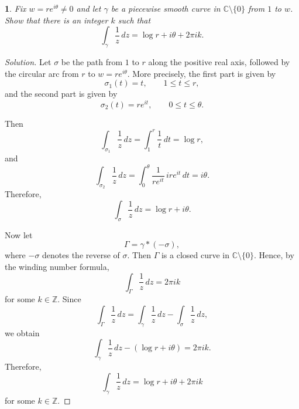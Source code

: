 \documentclass[12pt, a4paper]{report}
\theoremstyle{spaced}
\newtheorem{exercise}{}
\begin{document}
\begin{exercise}
	Fix \(w=re^{i\theta}\neq 0\) and let \(\gamma\) be a piecewise smooth curve in
	\(\mathbb{C}\setminus\{0\}\) from \(1\) to \(w\). Show that there is an integer
	\(k\) such that
	\[
		\int_\gamma \frac{1}{z}\,dz=\log r+i\theta+2\pi i k.
	\]
\end{exercise}
\begin{proof}[Solution]
	Let \(\sigma\) be the path from \(1\) to \(r\) along the positive real axis, followed by the circular arc from \(r\) to \(w=re^{i\theta}\). More precisely, the first part is given by
	\[
		\sigma_1(t)=t,
		\qquad 1\leq t\leq r,
	\]
	and the second part is given by
	\[
		\sigma_2(t)=re^{it},
		\qquad 0\leq t\leq \theta.
	\]

	Then
	\[
		\int_{\sigma_1}\frac{1}{z}\,dz
		=
		\int_1^r \frac{1}{t}\,dt
		=
		\log r,
	\]
	and
	\[
		\int_{\sigma_2}\frac{1}{z}\,dz
		=
		\int_0^\theta
		\frac{1}{re^{it}}\,ire^{it}\,dt
		=
		i\theta.
	\]
	Therefore,
	\[
		\int_\sigma \frac{1}{z}\,dz
		=
		\log r+i\theta.
	\]

	Now let
	\[
		\Gamma=\gamma*(-\sigma),
	\]
	where \(-\sigma\) denotes the reverse of \(\sigma\). Then \(\Gamma\) is a closed curve in
	\(\mathbb{C}\setminus\{0\}\). Hence, by the winding number formula,
	\[
		\int_\Gamma \frac{1}{z}\,dz
		=
		2\pi i k
	\]
	for some \(k\in\mathbb{Z}\).
	Since
	\[
		\int_\Gamma \frac{1}{z}\,dz
		=
		\int_\gamma \frac{1}{z}\,dz
		-
		\int_\sigma \frac{1}{z}\,dz,
	\]
	we obtain
	\[
		\int_\gamma \frac{1}{z}\,dz
		-
		\left(\log r+i\theta\right)
		=
		2\pi i k.
	\]
	Therefore,
	\[
		\int_\gamma \frac{1}{z}\,dz
		=
		\log r+i\theta+2\pi i k
	\]
	for some \(k\in\mathbb{Z}\).
\end{proof}
\end{document}
